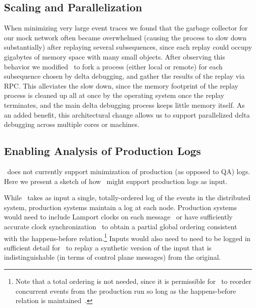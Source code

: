 \subsection{Scaling and Parallelization}

When minimizing very large event traces we found that the garbage collector
for our mock network often became overwhelmed (causing the process to slow down
substantially) after replaying several subsequences, since each replay could
occupy gigabytes of memory space with many small objects.
After observing this behavior we modified \projectname~to fork a process
(either local or remote) for each subsequence chosen by delta debugging,
and gather the results of the replay via RPC. This alleviates the slow down,
since the memory footprint of the replay process is cleaned up all at once by the
operating system once the
replay terminates, and the
main delta debugging process keeps little memory itself.
As an added benefit, this architectural change allows us to support
parallelized delta debugging across multiple cores or machines.

\subsection{Enabling Analysis of Production Logs}
\label{subsec:production_logs}

\projectname~does not currently support minimization of production (as opposed
to QA) logs.
Here we present a sketch of how \projectname~might support production logs as input.

While \simulator~takes as input a single, totally-ordered log of the events in the
distributed system, production systems maintain a log at each node.
Production systems would need to include Lamport
clocks on each message~\cite{Lamport:1978:TCO:359545.359563} or have
sufficiently accurate clock
synchronization~\cite{corbett2012spanner} to obtain a partial global ordering
consistent with the happens-before relation.\footnote{
Note that a total ordering is not needed, since it is permissible
for \simulator~to reorder concurrent events from
the production run so long as the happens-before relation is
maintained~\cite{Fischer:1985:IDC:3149.214121}.} Inputs would also
need to need to be logged in sufficient detail for \projectname~to
replay a synthetic version of the input that is indistinguishable (in terms
of control plane messages) from the original.

